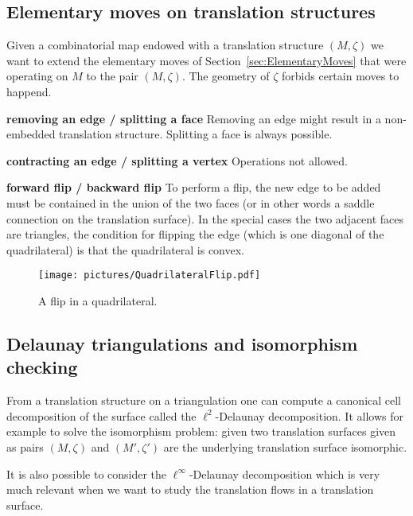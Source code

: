 \documentclass{article}
\newcommand{\commv}[1]{{\color{red!50!gray}{#1}}}
\begin{document}
\subsection{Elementary moves on translation structures}
Given a combinatorial map endowed with a translation structure $(M, \zeta)$
we want to extend the elementary moves of Section~\ref{sec:ElementaryMoves}
that were operating on $M$ to the pair $(M, \zeta)$. The geometry of $\zeta$
forbids certain moves to happend.

\textbf{removing an edge / splitting a face}
Removing an edge might result in a non-embedded translation structure.
Splitting a face is always possible.

\textbf{contracting an edge / splitting a vertex}
Operations not allowed.

\textbf{forward flip / backward flip}
To perform a flip, the new edge to be added must be contained in the union of
the two faces (or in other words a saddle connection on the translation surface).
In the special cases the two adjacent faces are triangles, the condition
for flipping the edge (which is one diagonal of the quadrilateral) is that the
quadrilateral is convex.
\begin{figure}[!ht]
\begin{center}\texttt{[image: pictures/QuadrilateralFlip.pdf]}\end{center}
\caption{A flip in a quadrilateral.}
\end{figure}

\subsection{Delaunay triangulations and isomorphism checking}
From a translation structure on a triangulation one can compute a canonical
cell decomposition of the surface called the $\ell^2$-Delaunay decomposition.
It allows for example to solve the isomorphism problem: given two
translation surfaces given as pairs $(M,\zeta)$ and $(M',\zeta')$ are
the underlying translation surface isomorphic.

It is also possible to consider the $\ell^\infty$-Delaunay decomposition
which is very much relevant when we want to study the translation flows
in a translation surface.

\commv{These are (simple enough) but essential algorithm.
\begin{enumerate}
\item TODO: implement $\ell^2$-Delaunay, isomorphism checking and isometry group,
\item TODO: implement $\ell^\infty$-Delaunay.
\end{enumerate}}
\end{document}
